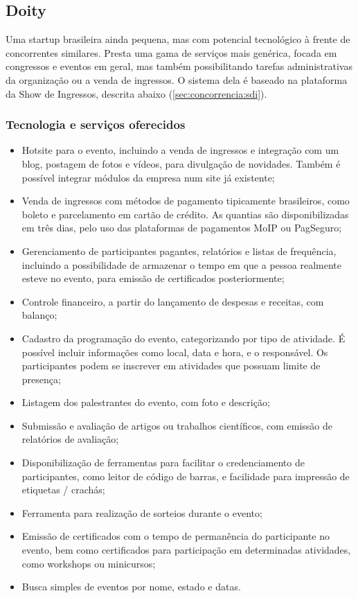 \documentclass[12pt,a4paper,twoside,hyphens,english,brazil]{abntex2}
\begin{document}
\subsection{Doity} \label{sec:concorrencia:doity:tec}
Uma startup brasileira ainda pequena, mas com potencial tecnológico à frente de concorrentes similares. Presta uma gama de serviços mais genérica, focada em congressos e eventos em geral, mas também possibilitando tarefas administrativas da organização ou a venda de ingressos.\cite{doity-como-funciona} O sistema dela é baseado na plataforma da Show de Ingressos, descrita abaixo (\autoref{sec:concorrencia:sdi}).

\subsubsection*{Tecnologia e serviços oferecidos}
\begin{itemize}[itemsep=-1ex]
	\item Hotsite para o evento, incluindo a venda de ingressos e integração com um blog, postagem de fotos e vídeos, para divulgação de novidades. Também é possível integrar módulos da empresa num site já existente;
	\item Venda de ingressos com métodos de pagamento tipicamente brasileiros, como boleto e parcelamento em cartão de crédito. As quantias são disponibilizadas em três dias, pelo uso das plataformas de pagamentos MoIP ou PagSeguro;
	\item Gerenciamento de participantes pagantes, relatórios e listas de frequência, incluindo a possibilidade de armazenar o tempo em que a pessoa realmente esteve no evento, para emissão de certificados posteriormente;
	\item Controle financeiro, a partir do lançamento de despesas e receitas, com balanço;
	\item Cadastro da programação do evento, categorizando por tipo de atividade. É possível incluir informações como local, data e hora, e o responsável. Os participantes podem se inscrever em atividades que possuam limite de presença;
	\item Listagem dos palestrantes do evento, com foto e descrição;
	\item Submissão e avaliação de artigos ou trabalhos científicos, com emissão de relatórios de avaliação;
	\item Disponibilização de ferramentas para facilitar o credenciamento de participantes, como leitor de código de barras, e facilidade para impressão de etiquetas / crachás;
	\item Ferramenta para realização de sorteios durante o evento;
	\item Emissão de certificados com o tempo de permanência do participante no evento, bem como certificados para participação em determinadas atividades, como workshops ou minicursos;
	\item Busca simples de eventos por nome, estado e datas.
\end{itemize}
\end{document}
